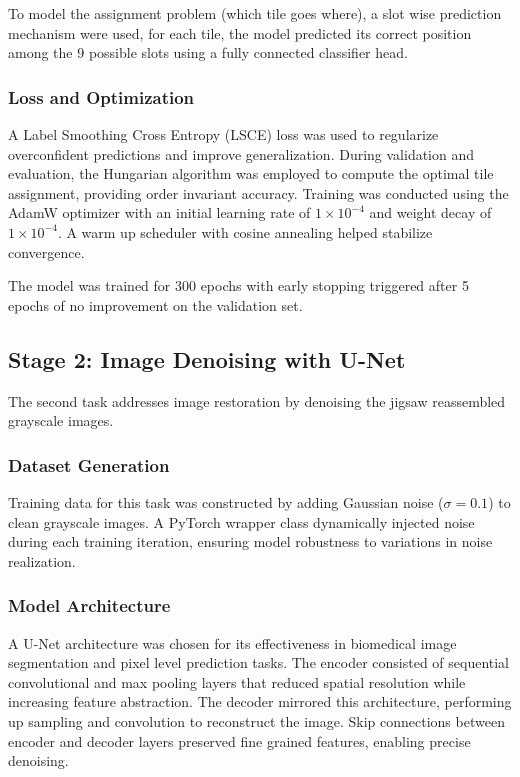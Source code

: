 \documentclass[%
 reprint,
 amsmath,amssymb,
 aps,
]{revtex4-2}
\begin{document}
To model the assignment problem (which tile goes where),  a slot wise prediction mechanism were used, for each tile, the model predicted its correct position among the 9 possible slots using a fully connected classifier head.

\subsubsection{Loss and Optimization}

A Label Smoothing Cross Entropy (LSCE) loss was used to regularize overconfident predictions and improve generalization. During validation and evaluation, the Hungarian algorithm was employed to compute the optimal tile assignment, providing order invariant accuracy. Training was conducted using the AdamW optimizer with an initial learning rate of $1 \times 10^{-4}$ and weight decay of $1 \times 10^{-4}$. A warm up scheduler with cosine annealing helped stabilize convergence.

The model was trained for 300 epochs with early stopping triggered after 5 epochs of no improvement on the validation set.

\subsection{Stage 2: Image Denoising with U-Net}

The second task addresses image restoration by denoising the jigsaw reassembled grayscale images. 

\subsubsection{Dataset Generation}

Training data for this task was constructed by adding Gaussian noise ($\sigma = 0.1$) to clean grayscale images. A PyTorch wrapper class dynamically injected noise during each training iteration, ensuring model robustness to variations in noise realization.

\subsubsection{Model Architecture}

A U-Net architecture was chosen for its effectiveness in biomedical image segmentation and pixel level prediction tasks. The encoder consisted of sequential convolutional and max pooling layers that reduced spatial resolution while increasing feature abstraction. The decoder mirrored this architecture, performing up sampling and convolution to reconstruct the image. Skip connections between encoder and decoder layers preserved fine grained features, enabling precise denoising.
\end{document}
